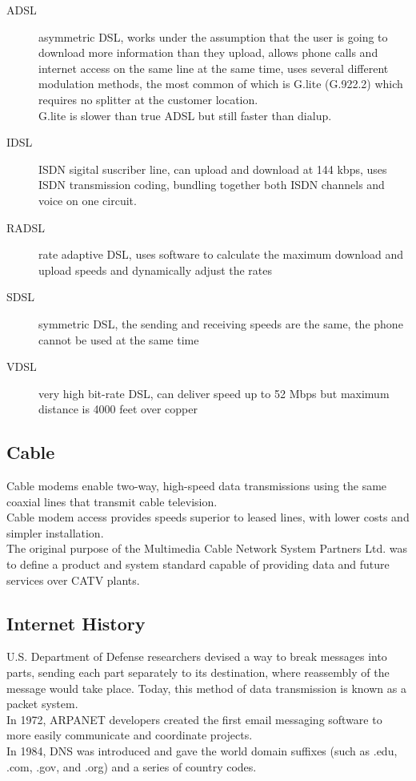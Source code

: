 \begin{description}

\item[ADSL]
asymmetric DSL, works under the assumption that the user is going to download
more information than they upload, allows phone calls and internet access on
the same line at the same time, uses several different modulation methods, the
most common of which is G.lite (G.922.2) which requires no splitter at the
customer location.\\

G.lite is slower than true ADSL but still faster than dialup.

\item[IDSL]
ISDN sigital suscriber line, can upload and download at 144 kbps, uses ISDN
transmission coding, bundling together both ISDN channels and voice on one
circuit. 

\item[RADSL]
rate adaptive DSL, uses software to calculate the maximum download and upload
speeds and dynamically adjust the rates

\item[SDSL]
symmetric DSL, the sending and receiving speeds are the same, the phone cannot
be used at the same time

\item[VDSL]
very high bit-rate DSL, can deliver speed up to 52 Mbps but maximum distance is
4000 feet over copper

\end{description}

\subsection{Cable}

Cable modems enable two-way, high-speed data transmissions using the same
coaxial lines that transmit cable television.\\

Cable modem access provides speeds superior to leased lines, with lower costs
and simpler installation.\\

The original purpose of the Multimedia Cable Network System Partners Ltd. was
to define a product and system standard capable of providing data and future
services over CATV plants.

\subsection{Internet History}

U.S. Department of Defense researchers devised a way to break messages into
parts, sending each part separately to its destination, where reassembly of the
message would take place. Today, this method of data transmission is known as a
packet system.\\

In 1972, ARPANET developers created the first email messaging software to more
easily communicate and coordinate projects.\\

In 1984, DNS was introduced and gave the world domain suffixes (such as .edu,
.com, .gov, and .org) and a series of country codes.
